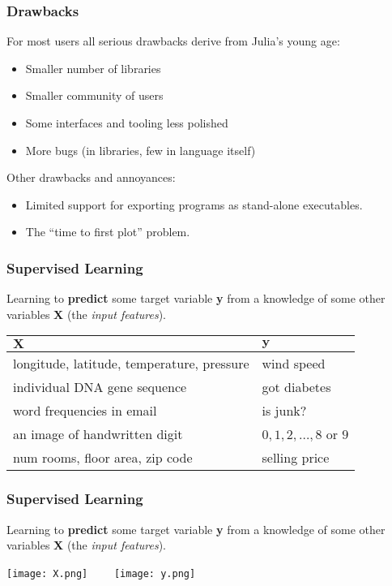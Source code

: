 \documentclass[t]{beamer}
\newcommand\df{\bf\color{Maroon}}
\begin{document}
\begin{frame}
  \frametitle{Drawbacks}
  For most users all serious drawbacks derive from Julia's young age:
  \begin{itemize}
     \item Smaller number of libraries
     \item Smaller community of users
     \item Some interfaces and tooling less polished
     \item More bugs (in libraries, few in language itself)
  \end{itemize}
  Other drawbacks and annoyances:
  \begin{itemize}
     \item Limited support for exporting programs as stand-alone executables.
     \item The ``time to first plot'' problem.
  \end{itemize}
\end{frame}



\begin{frame}
  \frametitle{Supervised Learning}
  Learning to {\df predict} some target variable {\df\large y} from a
  knowledge of some other variables {\df \large X} (the {\it input features}).\pause
  \begin{table}
  \begin{tabular}{|l|l|}
    \hline
    ${\mathbf X}$  & ${\mathbf y}$ \\ \hline
    longitude, latitude, temperature, pressure & wind speed \\
    individual DNA gene sequence & got diabetes\\
    word frequencies in email & is junk? \\
    an image of handwritten digit & $0, 1, 2, \ldots, 8$ or $9$ \\
    num rooms, floor area, zip code & selling price \\       
    \hline
  \end{tabular}
  \end{table}
\end{frame}

\begin{frame}
  \frametitle{Supervised Learning}
  Learning to {\df predict} some target variable {\df\large y} from a
  knowledge of some other variables {\df \large X} (the {\it input features}).
  \begin{center}
    \texttt{[image: X.png]}\mbox{~~~~}
    \texttt{[image: y.png]}
  \end{center}
\end{frame}
\end{document}
